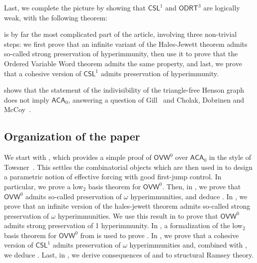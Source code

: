 \documentclass{article}
\newcommand{\RCA}[0]{\mathsf{RCA}}
\newcommand{\ACA}[0]{\mathsf{ACA}}
\newcommand{\CSL}[0]{\mathsf{CSL}}
\newcommand{\OVW}[0]{\mathsf{OVW}}
\newcommand{\ODRT}[0]{\mathsf{ODRT}}
\numberwithin{theorem}{section}
\newtheorem{maintheorem}[theorem]{Main Theorem}
\theoremstyle{definition}
\begin{document}
Last, we complete the picture by showing that $\CSL^1$ and $\ODRT^3$ are logically weak, with the following theorem:


 is by far the most complicated part of the article, involving three non-trivial steps: we first prove that an infinite variant of the Hales-Jewett theorem admits so-called strong preservation of hyperimmunity, then use it to prove that the Ordered Variable Word theorem admits the same property, and last, we prove that a cohesive version of $\CSL^1$ admits preservation of hyperimmunity. 

 shows that the statement of the indivisibility of the triangle-free Henson graph does not imply $\ACA_0$, answering a question of Gill~\cite{gill2023note} and Cholak, Dobrinen and McCoy~\cite[Question 48]{cholak2026henson}.

\subsection{Organization of the paper}

We start with , which provides a simple proof of $\OVW^0$ over $\ACA_0$ in the style of Towsner~\cite{towsner2012simple}. This settles the combinatorial objects which are then used in  to design a parametric notion of effective forcing with good first-jump control. In particular, we prove a low${}_2$ basis theorem for $\OVW^0$. Then, in , we prove that $\OVW^0$ admits so-called preservation of $\omega$ hyperimmunities, and deduce . In , we prove that an infinite version of the hales-jewett theorem admits so-called strong preservation of $\omega$ hyperimmunities. We use this result in  to prove that $\OVW^0$ admits strong preservation of 1 hyperimmunity.  In , a formalization of the low${}_2$ basis theorem for $\OVW^0$ from  is used to prove . In , we prove that a cohesive version of $\CSL^1$ admits preservation of $\omega$ hyperimmunities and, combined with , we deduce . Last, in , we derive consequences of  and  to structural Ramsey theory.
\end{document}
